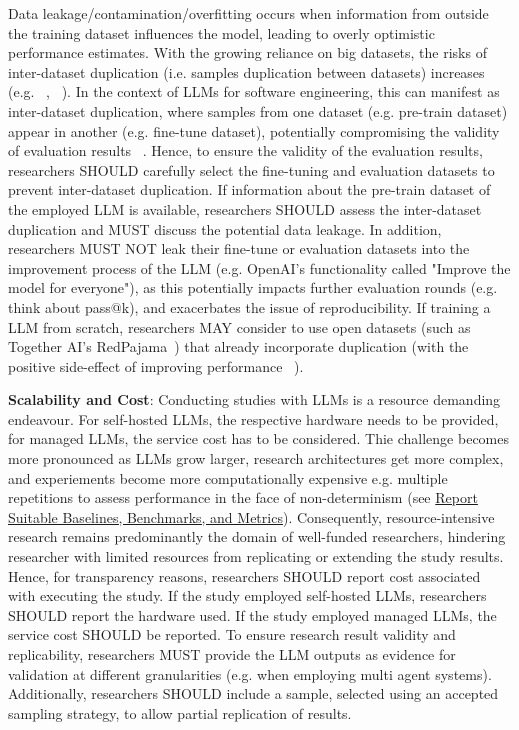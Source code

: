 Data leakage/contamination/overfitting occurs when information from outside the training dataset influences the model, leading to overly optimistic performance estimates. With the growing reliance on big datasets, the risks of inter-dataset duplication (i.e. samples duplication between datasets) increases (e.g. ~\cite{DBLP:journals/pacmpl/LopesMMSYZSV17}, ~\cite{DBLP:conf/oopsla/Allamanis19}). 
In the context of LLMs for software engineering, this can manifest as inter-dataset duplication, where samples from one dataset (e.g. pre-train dataset) appear in another (e.g. fine-tune dataset), potentially compromising the validity of evaluation results ~\cite{DBLP:journals/tse/LopezCSSV25}. 
Hence, to ensure the validity of the evaluation results, researchers SHOULD carefully select the fine-tuning and evaluation datasets to prevent inter-dataset duplication. If information about the pre-train dataset of the employed LLM is available, researchers SHOULD assess the inter-dataset duplication and MUST discuss the potential data leakage.
In addition, researchers MUST NOT leak their fine-tune or evaluation datasets into the improvement process of the LLM (e.g. OpenAI's functionality called "Improve the model for everyone"), as this potentially impacts further evaluation rounds (e.g. think about pass@k), and exacerbates the issue of reproducibility.
If training a LLM from scratch, researchers MAY consider to use open datasets (such as Together AI's RedPajama~\cite{together2023redpajama}) that already incorporate duplication (with the positive side-effect of improving performance ~\cite{DBLP:conf/acl/LeeINZECC22}).

\textbf{Scalability and Cost}:
Conducting studies with LLMs is a resource demanding endeavour. For self-hosted LLMs, the respective hardware needs to be provided, for managed LLMs, the service cost has to be considered. Thie challenge becomes more pronounced as LLMs grow larger, research architectures get more complex, and experiements become more computationally expensive e.g. multiple repetitions to assess performance in the face of non-determinism (see \href{/guidelines/report-baselines-benchmarks-and-metrics}{Report Suitable Baselines, Benchmarks, and Metrics}).
Consequently, resource-intensive research remains predominantly the domain of well-funded researchers, hindering researcher with limited resources from replicating or extending the study results.
Hence, for transparency reasons, researchers SHOULD report cost associated with executing the study. If the study employed self-hosted LLMs, researchers SHOULD report the hardware used. If the study employed managed LLMs, the service cost SHOULD be reported.
To ensure research result validity and replicability, researchers MUST provide the LLM outputs as evidence for validation at different granularities (e.g. when employing multi agent systems). Additionally, researchers SHOULD include a sample, selected using an accepted sampling strategy, to allow partial replication of results.

